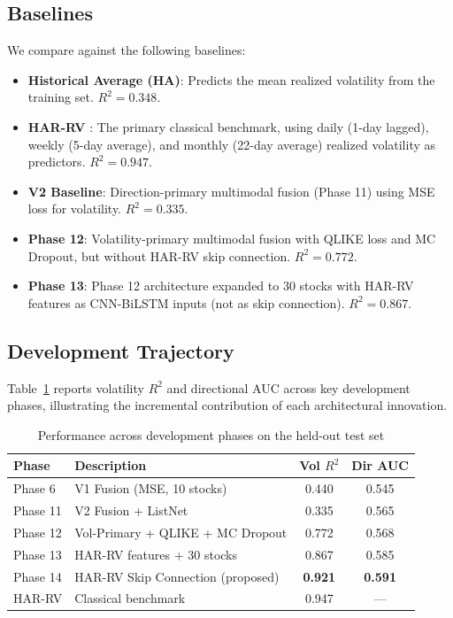 \documentclass[12pt, a4paper]{article}
\begin{document}
\subsection{Baselines}

We compare against the following baselines:
\begin{itemize}[noitemsep]
    \item \textbf{Historical Average (HA)}: Predicts the mean realized volatility from the training set. $R^2 = 0.348$.
    \item \textbf{HAR-RV} \citep{corsi2009simple}: The primary classical benchmark, using daily (1-day lagged), weekly (5-day average), and monthly (22-day average) realized volatility as predictors. $R^2 = 0.947$.
    \item \textbf{V2 Baseline}: Direction-primary multimodal fusion (Phase 11) using MSE loss for volatility. $R^2 = 0.335$.
    \item \textbf{Phase 12}: Volatility-primary multimodal fusion with QLIKE loss and MC Dropout, but without HAR-RV skip connection. $R^2 = 0.772$.
    \item \textbf{Phase 13}: Phase 12 architecture expanded to 30 stocks with HAR-RV features as CNN-BiLSTM inputs (not as skip connection). $R^2 = 0.867$.
\end{itemize}

\subsection{Development Trajectory}

Table~\ref{tab:phases} reports volatility $R^2$ and directional AUC across key development phases, illustrating the incremental contribution of each architectural innovation.

\begin{table}[H]
\centering
\caption{Performance across development phases on the held-out test set}
\label{tab:phases}
\begin{tabular}{llcc}
\toprule
\textbf{Phase} & \textbf{Description} & \textbf{Vol $R^2$} & \textbf{Dir AUC} \\
\midrule
Phase 6  & V1 Fusion (MSE, 10 stocks)         & 0.440 & 0.545 \\
Phase 11 & V2 Fusion + ListNet                & 0.335 & 0.565 \\
Phase 12 & Vol-Primary + QLIKE + MC Dropout   & 0.772 & 0.568 \\
Phase 13 & HAR-RV features + 30 stocks        & 0.867 & 0.585 \\
Phase 14 & HAR-RV Skip Connection (proposed)  & \textbf{0.921} & \textbf{0.591} \\
\midrule
HAR-RV   & Classical benchmark                & 0.947 & ---   \\
\bottomrule
\end{tabular}
\end{table}
\end{document}
